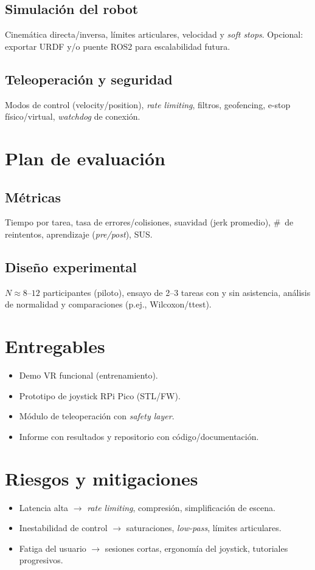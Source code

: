 \subsection{Simulación del robot}
Cinemática directa/inversa, límites articulares, velocidad y \textit{soft stops}. Opcional: exportar URDF y/o puente ROS2 para escalabilidad futura.

\subsection{Teleoperación y seguridad}
Modos de control (velocity/position), \textit{rate limiting}, filtros, geofencing, e-stop físico/virtual, \textit{watchdog} de conexión.

\section{Plan de evaluación}
\subsection{Métricas}
Tiempo por tarea, tasa de errores/colisiones, suavidad (jerk promedio), \#\ de reintentos, aprendizaje (\textit{pre/post}), SUS.
\subsection{Diseño experimental}
$N \approx 8$--$12$ participantes (piloto), ensayo de 2–3 tareas con y sin asistencia, análisis de normalidad y comparaciones (p.ej., Wilcoxon/ttest).



\section{Entregables}
\begin{itemize}
  \item Demo VR funcional (entrenamiento).
  \item Prototipo de joystick RPi Pico (STL/FW).
  \item Módulo de teleoperación con \textit{safety layer}.
  \item Informe con resultados y repositorio con código/documentación.
\end{itemize}

\section{Riesgos y mitigaciones}
\begin{itemize}
  \item Latencia alta $\rightarrow$ \textit{rate limiting}, compresión, simplificación de escena.
  \item Inestabilidad de control $\rightarrow$ saturaciones, \textit{low-pass}, límites articulares.
  \item Fatiga del usuario $\rightarrow$ sesiones cortas, ergonomía del joystick, tutoriales progresivos.
\end{itemize}

